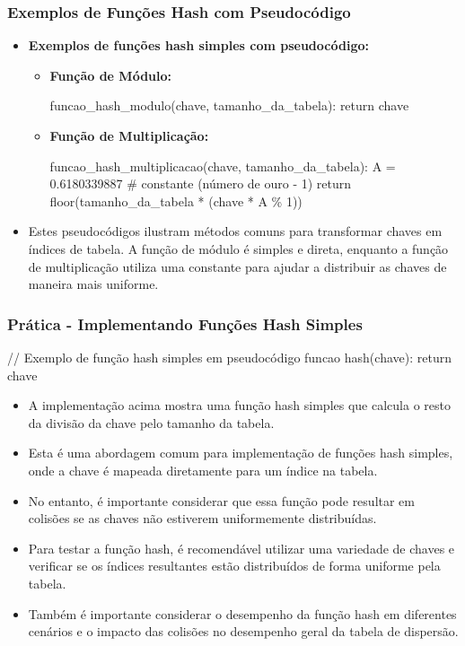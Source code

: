 \begin{frame}[fragile]
  \frametitle{Exemplos de Funções Hash com Pseudocódigo}
  \begin{itemize}
    \item \textbf{Exemplos de funções hash simples com pseudocódigo:}
      \begin{itemize}
        \item \textbf{Função de Módulo:}
        \begin{mysmallverbatim}
            funcao_hash_modulo(chave, tamanho_da_tabela):
              return chave %
        \end{mysmallverbatim}
        \item \textbf{Função de Multiplicação:}
          \begin{mysmallverbatim}
            funcao_hash_multiplicacao(chave, tamanho_da_tabela):
              A = 0.6180339887 # constante (número de ouro - 1)
              return floor(tamanho_da_tabela * (chave * A \% 1))
          \end{mysmallverbatim}
      \end{itemize}
    \item Estes pseudocódigos ilustram métodos comuns para transformar chaves 
    em índices de tabela. A função de módulo é simples e direta, enquanto a 
    função de multiplicação utiliza uma constante para ajudar a distribuir as 
    chaves de maneira mais uniforme.
  \end{itemize}
\end{frame}





\begin{frame}[fragile]
  \frametitle{Prática - Implementando Funções Hash Simples}
  \begin{mysmallverbatim}
    // Exemplo de função hash simples em pseudocódigo
    funcao hash(chave):
      return chave %
  \end{mysmallverbatim}
  \begin{itemize}
    \item A implementação acima mostra uma função hash simples que calcula o resto da divisão da chave pelo tamanho da tabela.
    \item Esta é uma abordagem comum para implementação de funções hash simples, onde a chave é mapeada diretamente para um índice na tabela.
    \item No entanto, é importante considerar que essa função pode resultar em colisões se as chaves não estiverem uniformemente distribuídas.
    \item Para testar a função hash, é recomendável utilizar uma variedade de chaves e verificar se os índices resultantes estão distribuídos de forma uniforme pela tabela.
    \item Também é importante considerar o desempenho da função hash em diferentes cenários e o impacto das colisões no desempenho geral da tabela de dispersão.
  \end{itemize}
\end{frame}


